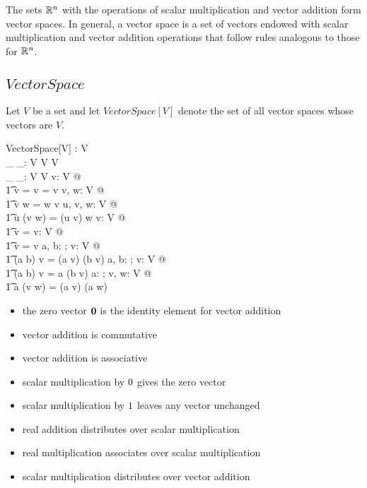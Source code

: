 \documentclass[11pt, oneside]{article}
\begin{document}
The sets $\mathbb{R}^n$ with the operations of scalar multiplication and vector addition form vector spaces.
In general, a vector space is a set of vectors endowed with scalar multiplication and vector addition operations that
follow rules analogous to those for $\mathbb{R}^n$.

\subsection{$VectorSpace$}

Let $V$ be a set and let $VectorSpace[V]$ denote the set of all vector spaces whose vectors are $V$.

\begin{schema}{VectorSpace}[V]
	\zeroV: V \\
	\_ \addV \_: V \cross V \fun V \\
	\_ \smulV \_: \R \cross V \fun V
\where
	\forall v: V @ \\
	\t1	\zeroV \addV v = v = v \addV \zeroV
\also
	\forall v, w: V @ \\
	\t1	v \addV w = w \addV v
\also
	\forall u, v, w: V @ \\
	\t1	u \addV (v \addV w) = (u \addV v) \addV w
\also
	\forall v: V @ \\
	\t1	\zeroR \smulV v = \zeroV
\also
	\forall v: V @ \\
	\t1	\oneR \smulV v = v
\also
	\forall a, b: \R; v: V @ \\
	\t1	(a \addR b) \smulV v = (a \smulV v) \addV (b \smulV v)
\also
	\forall a, b: \R; v: V @ \\
	\t1	(a \mulR b) \smulV v = a \smulV (b \smulV v)
\also
	\forall a: \R; v, w: V @ \\
	\t1	a \smulV (v \addV w) = (a \smulV v) \addV (a \smulV w)
\end{schema}
\begin{itemize}
	\item the zero vector $\mathbf{0}$ is the identity element for vector addition
	\item vector addition is commutative
	\item vector addition is associative
	\item scalar multiplication by $0$ gives the zero vector
	\item scalar multiplication by $1$ leaves any vector unchanged
	\item real addition distributes over scalar multiplication
	\item real multiplication associates over scalar multiplication
	\item scalar multiplication distributes over vector addition
\end{itemize}
\end{document}
